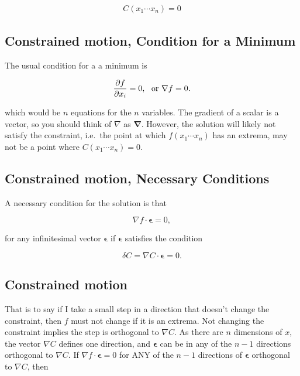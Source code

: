 \documentclass[%
oneside,                 %
final,                   %
10pt]{article}
\begin{document}
\begin{eqnarray}
C(x_1\cdots x_n)=0
\end{eqnarray}

\subsection{Constrained motion, Condition for a Minimum}

The usual condition for a a minimum is

\begin{eqnarray}
\frac{\partial f}{\partial x_i}=0{\rm ,~~or~}\nabla f=0.
\end{eqnarray}

which would be $n$ equations for the $n$ variables. The gradient of a
scalar is a vector, so you should think of $\nabla$ as
$\bm{\nabla}$. However, the solution will likely not satisfy the
constraint, i.e.~the point at which $f(x_1\cdots x_n)$ has an extrema,
may not be a point where $C(x_1\cdots x_n)=0$.

\subsection{Constrained motion, Necessary Conditions}

A necessary condition for the solution is that

\begin{equation}
\nabla f\cdot\bm{\epsilon}=0,
\end{equation}

for any infinitesimal vector $\bm{\epsilon}$ if $\bm{\epsilon}$
satisfies the condition

\begin{equation}
\delta C=\nabla C\cdot\bm{\epsilon}=0.
\end{equation}

\subsection{Constrained motion}

That is to say if I take a small step in a direction that doesn't
change the constraint, then $f$ must not change if it is an
extrema. Not changing the constraint implies the step is orthogonal to
$\nabla C$. As there are $n$ dimensions of $x$, the vector $\nabla C$
defines one direction, and $\bm{\epsilon}$ can be in any of the $n-1$
directions orthogonal to $\nabla C$. If $\nabla f\cdot\bm{\epsilon}=0$
for ANY of the $n-1$ directions of $\bm{\epsilon}$ orthogonal to
$\nabla C$, then
\end{document}
